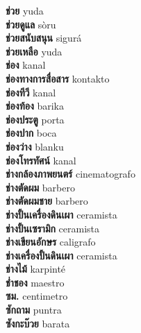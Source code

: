 \textbf{ ช่วย  } yuda \\
\textbf{ ช่วยดูแล  } sòru \\
\textbf{ ช่วยสนับสนุน  } sigurá \\
\textbf{ ช่วยเหลือ  } yuda \\
\textbf{ ช่อง  } kanal \\
\textbf{ ช่องทางการสื่อสาร  } kontakto \\
\textbf{ ช่องทีวี  } kanal \\
\textbf{ ช่องท้อง  } barika \\
\textbf{ ช่องประตู  } porta \\
\textbf{ ช่องปาก  } boca \\
\textbf{ ช่องว่าง  } blanku \\
\textbf{ ช่องโทรทัศน์  } kanal \\
\textbf{ ช่างกล้องภาพยนตร์  } cinematografo \\
\textbf{ ช่างตัดผม  } barbero \\
\textbf{ ช่างตัดผมชาย  } barbero \\
\textbf{ ช่างปั้นเครื่องดินเผา  } ceramista \\
\textbf{ ช่างปั้นเซรามิก  } ceramista \\
\textbf{ ช่างเขียนอักษร  } caligrafo \\
\textbf{ ช่างเครื่องปั้นดินเผา  } ceramista \\
\textbf{ ช่างไม้  } karpinté \\
\textbf{ ช่ำชอง  } maestro \\
\textbf{ ซม.  } centimetro \\
\textbf{ ซักถาม  } puntra \\
\textbf{ ซังกะบ๊วย  } barata \\
